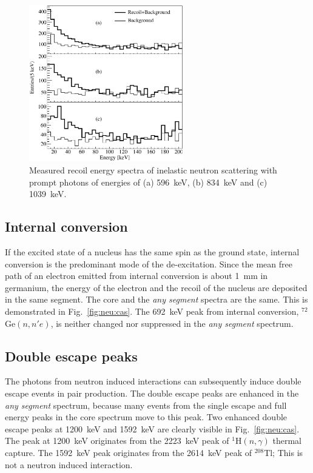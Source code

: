 \begin{figure}[tbhp]
\centering
\includegraphics[width=0.6\textwidth]{recoil}
\caption{Measured recoil energy spectra of inelastic neutron
scattering with prompt photons of energies of (a) 596~keV, (b) 834~keV
and (c) 1039~keV.}
\label{fig:neu:recoil}
\end{figure}

\subsection{Internal conversion}
\label{sec:neu:conv}
If the excited state of a nucleus has the same spin as the ground
state, internal conversion \cite{Lis69, Kra56} is the predominant mode
of the de-excitation. Since the mean free path of an electron emitted
from internal conversion is about 1~mm in germanium, the energy of the
electron and the recoil of the nucleus are deposited in the same
segment. The core and the \emph{any segment} spectra are the
same. This is demonstrated in Fig.~\ref{fig:neu:cas}. The 692~keV peak
from internal conversion, $^{72}$Ge$(n,n'e)$, is neither changed nor
suppressed in the \emph{any segment} spectrum.

\subsection{Double escape peaks}
\label{sec:neu:dep}
The photons from neutron induced interactions can subsequently induce
double escape events in pair production. The double escape peaks are
enhanced in the \emph{any segment} spectrum, because many events from
the single escape and full energy peaks in the core spectrum move to
this peak. Two enhanced double escape peaks at 1200~keV and 1592~keV
are clearly visible in Fig.~\ref{fig:neu:cas}. The peak at 1200~keV
originates from the 2223~keV peak of $^{1}$H$(n,\gamma)$ thermal
capture. The 1592~keV peak originates from the 2614~keV peak of
$^{208}$Tl; This is not a neutron induced interaction.


